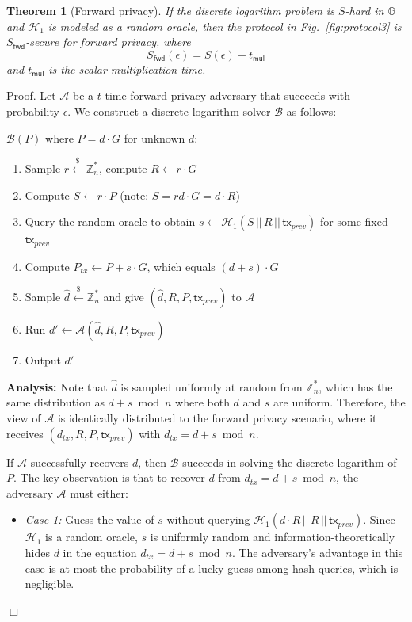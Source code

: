 \documentclass{article}
\newtheorem{theorem}{Theorem}[section]
\newenvironment{proof}{\textsf{Proof}.}{\hfill$\Box$}
\begin{document}
\begin{theorem}[Forward privacy]
\label{thm:forward-privacy}
If the discrete logarithm problem is $S$-hard in $\mathbb{G}$ and $\mathcal{H}_1$ is modeled as a random oracle, then the protocol in Fig.~\ref{fig:protocol3} is $S_\mathsf{fwd}$-secure for forward privacy, where
$$S_\mathsf{fwd}(\epsilon) = S(\epsilon) - t_\mathsf{mul}$$
and $t_\mathsf{mul}$ is the scalar multiplication time.
\end{theorem}

\begin{proof}
Let $\mathcal{A}$ be a $t$-time forward privacy adversary that succeeds with probability $\epsilon$. We construct a discrete logarithm solver $\mathcal{B}$ as follows:

$\mathcal{B}(P)$ where $P = d \cdot G$ for unknown $d$:
\begin{enumerate}
\item Sample $r \stackrel{\$}{\leftarrow} \mathbb{Z}_n^*$, compute $R \leftarrow r \cdot G$
\item Compute $S \leftarrow r \cdot P$ (note: $S = rd \cdot G = d \cdot R$)
\item Query the random oracle to obtain $s \leftarrow \mathcal{H}_1(S \,||\, R \,||\, \mathsf{tx}_{prev})$ for some fixed $\mathsf{tx}_{prev}$
\item Compute $P_{tx} \leftarrow P + s \cdot G$, which equals $(d + s) \cdot G$
\item Sample $\hat{d} \stackrel{\$}{\leftarrow} \mathbb{Z}_n^*$ and give $(\hat{d}, R, P, \mathsf{tx}_{prev})$ to $\mathcal{A}$
\item Run $d' \gets \mathcal{A}(\hat{d}, R, P, \mathsf{tx}_{prev})$
\item Output $d'$
\end{enumerate}

\textbf{Analysis:} Note that $\hat{d}$ is sampled uniformly at random from $\mathbb{Z}_n^*$, which has the same distribution as $d + s \bmod n$ where both $d$ and $s$ are uniform. Therefore, the view of $\mathcal{A}$ is identically distributed to the forward privacy scenario, where it receives $(d_{tx}, R, P, \mathsf{tx}_{prev})$ with $d_{tx} = d + s \bmod n$.

If $\mathcal{A}$ successfully recovers $d$, then $\mathcal{B}$ succeeds in solving the discrete logarithm of $P$. The key observation is that to recover $d$ from $d_{tx} = d + s \bmod n$, the adversary $\mathcal{A}$ must either:

\begin{itemize}
\item \textit{Case 1:} Guess the value of $s$ without querying $\mathcal{H}_1(d \cdot R \,||\, R \,||\, \mathsf{tx}_{prev})$. Since $\mathcal{H}_1$ is a random oracle, $s$ is uniformly random and information-theoretically hides $d$ in the equation $d_{tx} = d + s \bmod n$. The adversary's advantage in this case is at most the probability of a lucky guess among hash queries, which is negligible.


\end{itemize}
\end{proof}
\end{document}
